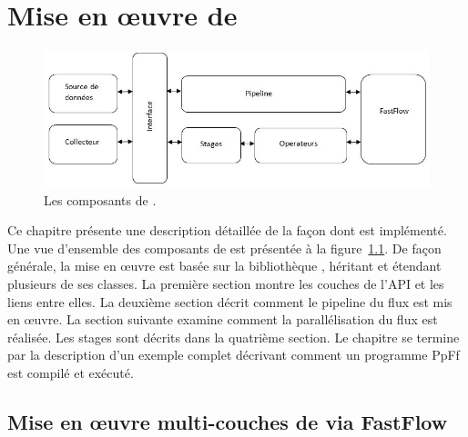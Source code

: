 
\chapter{Mise en \oe{}uvre de \PpFf}
\label{implementation.chap}




\begin{figure}[ht]
\centering
     \includegraphics[width=1.0\textwidth]{Figures/AllComponentsAPI.jpg}
      \caption{Les composants de .}
       \label{AllComponentsAPI.fig}
\end{figure}


Ce chapitre pr\'esente une description d\'etaill\'ee de la fa\c{c}on dont  est impl\'ement\'e. Une vue d'ensemble des composants de  est pr\'esent\'ee \`a la figure~\ref{AllComponentsAPI.fig}. De fa\c{c}on g\'en\'erale, la mise en \oe{}uvre est bas\'ee sur la biblioth\`eque , h\'eritant et \'etendant plusieurs de ses classes. La premi\`ere section montre les couches de l'API et les liens entre elles.  La deuxi\`eme section d\'ecrit comment le pipeline du flux est mis en œuvre. La section suivante examine comment la parall\'elisation du flux est r\'ealis\'ee. Les stages sont d\'ecrits dans la quatri\`eme section. Le chapitre se termine par la description d'un exemple complet d\'ecrivant comment un programme PpFf est compil\'e et ex\'ecut\'e.


\section{Mise en \oe{}uvre multi-couches de \PpFf{} via FastFlow}


